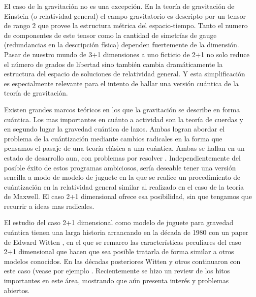 \documentclass[A4paper,12pt]{article}
\begin{document}
El caso de la gravitación no es una excepción. En la teoría de gravitación de Einstein (o relatividad general) el campo gravitatorio es descripto por un tensor de rango 2 que provee la estructura métrica del espacio-tiempo. Tanto el numero de componentes de este tensor como la cantidad de simetrías de gauge (redundancias en la descripción física) dependen fuertemente de la dimensión. Pasar de nuestro mundo de 3+1 dimensiones a uno ficticio de 2+1 no solo reduce el número de grados de libertad sino también cambia dramáticamente la estructura del espacio de soluciones de relatividad general. Y esta simplificación es especialmente relevante para el intento de hallar una versión cuántica de la teoría de gravitación.



Existen grandes marcos teóricos en los que la gravitación se describe en forma cuántica. Los mas importantes en cuánto a actividad son la teoría de cuerdas y en segundo lugar la gravedad cuántica de lazos. Ambas logran abordar el problema de la cuántización mediante cambios radicales en la forma que pensamos el pasaje de una teoría clásica a una cuántica. Ambas se hallan en un estado de desarrollo aun, con problemas por resolver \cite{Jay}. Independientemente del posible éxito de estos programas ambiciosos, sería deseable tener una versión sencilla a modo de modelo de juguete en la que se realice un procedimiento de cuántización en la relatividad general similar al realizado en el caso de la teoría de Maxwell. El caso 2+1 dimensional ofrece esa posibilidad, sin que tengamos que recurrir a ideas mas radicales.

El estudio del caso 2+1 dimensional como modelo de juguete para gravedad cuántica tienen una larga historia arrancando en la década de 1980 con un paper de Edward Witten \cite{Wittensoluble}, en el que se remarco las características peculiares del caso 2+1 dimensional que hacen que sea posible tratarla de forma similar a otros modelos conocidos. En las  décadas posteriores Witten y otros continuaron con este caso (vease por ejemplo \cite{Wittenrevisited}. Recientemente \cite{Carlip} se hizo un review de los hitos importantes en este área, mostrando que aún presenta interés y problemas abiertos.
\end{document}
